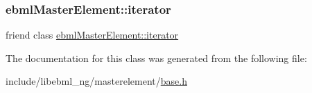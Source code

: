 \mbox{\label{classebml_1_1ebmlMasterElement_1_1__iterator_a7f678a46134f738b99dfff4aafa7fc5f}} 
\subsubsection{\texorpdfstring{ebml\+Master\+Element\+::iterator}{ebmlMasterElement::iterator}}
{\footnotesize\ttfamily friend class \mbox{\hyperlink{classebml_1_1ebmlMasterElement_1_1iterator}{ebml\+Master\+Element\+::iterator}}\hspace{0.3cm}{\ttfamily [friend]}}



The documentation for this class was generated from the following file\+:\begin{DoxyCompactItemize}
\item 
include/libebml\+\_\+ng/masterelement/\mbox{\hyperlink{masterelement_2base_8h}{base.\+h}}\end{DoxyCompactItemize}
